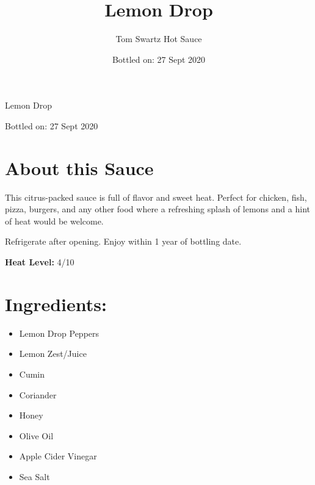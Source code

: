 \documentclass[12pt]{article}
\title{Lemon Drop}
\author{Tom Swartz Hot Sauce}
\date{Bottled on: 27 Sept 2020}
\begin{document}
\begin{center}
{\Huge Lemon Drop}
\par
{\Large Bottled on: 27 Sept 2020}
\vfill
\begin{minipage}{0.45\textwidth}
\Large
\section*{About this Sauce \color{black}\hrulefill\color{black}}
This citrus-packed sauce is full of flavor and sweet heat. Perfect for chicken,
fish, pizza, burgers, and any other food where a refreshing splash of lemons
and a hint of heat would be welcome.
\par
Refrigerate after opening.
Enjoy within 1 year of bottling date.
\begin{center}
        {\LARGE
        \textbf{Heat Level:} 4/10
        }
\end{center}
\end{minipage}
\hfill
\begin{minipage}{0.45\textwidth}
\vspace{-0.4cm}
\Large
\section*{\hspace{0.5cm}Ingredients: \color{black}\hrulefill\color{black}}
\begin{itemize}
        \item Lemon Drop Peppers
        \item Lemon Zest/Juice
        \item Cumin
        \item Coriander
        \item Honey
        \item Olive Oil
        \item Apple Cider Vinegar
        \item Sea Salt
\end{itemize}
\end{minipage}
\end{center}
\end{document}
